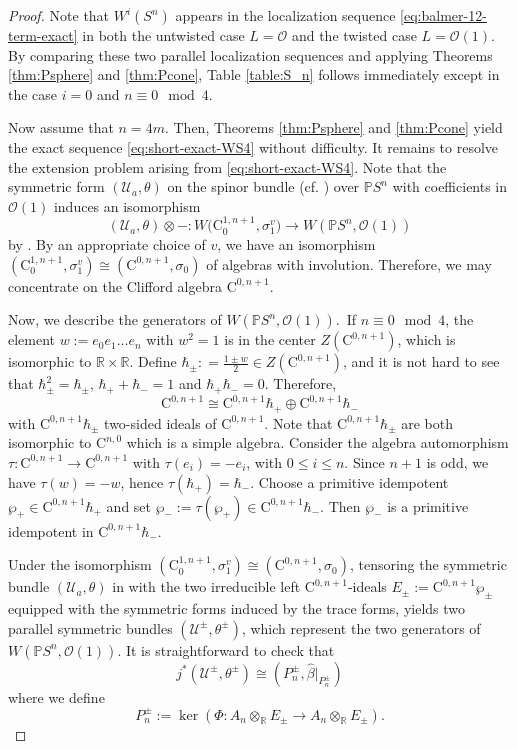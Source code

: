 \documentclass[psamsfonts]{amsart}
\theoremstyle{plain}
\theoremstyle{theorem}
\theoremstyle{definition}
\newcommand{\C}{\mathrm{C}}
\newcommand{\SO}{\mathcal{O}}
\newcommand{\UC}{\mathscr{U}}
\newcommand{\R}{\mathbb{R}}
\begin{document}
	\begin{proof}
Note that $W^i(S^n)$ appears in the localization sequence \eqref{eq:balmer-12-term-exact} in both the untwisted case $L=\SO$ and the twisted case $L=\SO(1)$. By comparing these two parallel localization sequences and applying Theorems \ref{thm:Psphere} and \ref{thm:Pcone}, Table \ref{table:S_n} follows immediately except in the case $i=0$ and $n \equiv 0 \mod 4$. 

Now assume that $n=4m$. Then, Theorems \ref{thm:Psphere} and \ref{thm:Pcone} yield the exact sequence \eqref{eq:short-exact-WS4} without difficulty. It remains to resolve the extension problem arising from \eqref{eq:short-exact-WS4}. Note that the symmetric form $(\UC_a, \theta)$ on the spinor bundle (cf. \cite[Prop. 4.7]{X26}) over $\mathbb{P}S^{n}$ with coefficients in $\SO(1)$ induces an isomorphism 
\[ (\UC_a, \theta)\otimes - : W\big(\C_0^{1,n+1},\sigma_1^v\big) \to W(\mathbb{P}S^n,\SO(1))  \]
by \cite[Proposition 5.9]{X26}. By an appropriate choice of $v$, we have an isomorphism $(\C^{1,n+1}_0,\sigma_1^v) \cong (\C^{0,n+1},\sigma_0) $
of algebras with involution. Therefore, we may concentrate on the Clifford algebra $\C^{0,n+1}$. 

Now, we describe the generators of $W(\mathbb{P}S^n,\SO(1))$.\ If $n \equiv 0 \mod 4$, the element $w := e_0 e_1 \ldots  e_n$ with $w^2 =1$ is in the center $Z(\C^{0,n+1})$, which is isomorphic to $\R \times \R$. Define $\hbar_\pm: = \frac{1\pm w}{2} \in Z(\C^{0,n+1})$, and it is not hard to see that $\hbar_\pm^2 = \hbar_\pm$, $\hbar_+ + \hbar_- = 1$ and $\hbar_+ \hbar_- = 0$. Therefore, 
\[ \C^{0,n+1} \cong \C^{0,n+1} \hbar_+ \oplus  \C^{0,n+1} \hbar_- \]
with $\C^{0,n+1} \hbar_\pm$ two-sided ideals of $\C^{0,n+1}$. Note that $\C^{0,n+1}\hbar_\pm$ are both isomorphic to $\C^{n,0}$ which is a simple algebra. 
Consider the algebra automorphism $\tau:\C^{0,n+1}\to \C^{0,n+1}$ with $ \tau(e_i)=-e_i$, with $0\le i\le n$.
Since $n+1$ is odd, we have $\tau(w)=-w$, hence $\tau(\hbar_+)=\hbar_-$.
Choose a primitive idempotent $\wp_+\in \C^{0,n+1}\hbar_+$ and set $\wp_-:=\tau(\wp_+)\in \C^{0,n+1}\hbar_-.$ Then $\wp_-$ is a primitive idempotent in $\C^{0,n+1}\hbar_-$. 

Under the isomorphism $(\C^{1,n+1}_0,\sigma_1^v) \cong (\C^{0,n+1},\sigma_0) $, tensoring the symmetric bundle $(\UC_a,\theta)$ in \cite[Prop 4.7]{X26} with the two irreducible left $\C^{0,n+1}$-ideals $E_\pm:= \C^{0,n+1} \wp_\pm$ equipped with the symmetric forms induced by the trace forms, yields two parallel symmetric bundles $(\UC^{\pm}, \theta^\pm)$, which represent the two generators of $W(\mathbb{P}S^n,\SO(1))$. It is straightforward to check that 
\[j^*(\UC^{\pm}, \theta^\pm) \cong (P_n^\pm,\hat\beta|_{P_n^\pm}) \]
where  we define 
\[P^\pm_n:= \ker(\Phi: A_n \otimes_{\mathbb{R}} E_\pm \to A_n \otimes_{\mathbb{R}} E_\pm ). \]


\end{proof}
\end{document}
